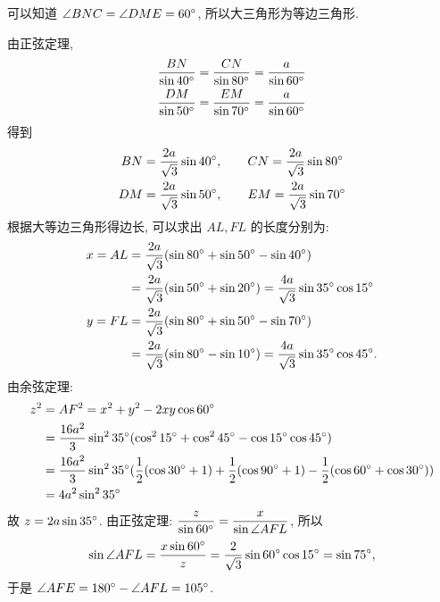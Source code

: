 可以知道 $\angle BNC = \angle DME = 60\degree$, 所以大三角形为等边三角形. 

由正弦定理, 
\begin{align*}
\frac{BN}{\sin 40\degree} &= \frac{CN}{\sin 80\degree} = \frac{a}{\sin 60\degree}\\
\frac{DM}{\sin 50\degree} &= \frac{EM}{\sin 70\degree} = \frac{a}{\sin 60\degree}
\end{align*}
得到
\begin{align*}
BN &= \frac{2a}{\sqrt{3}}\sin 40\degree, \qquad CN = \frac{2a}{\sqrt{3}}\sin 80\degree\\
DM &= \frac{2a}{\sqrt{3}}\sin 50\degree, \qquad EM = \frac{2a}{\sqrt{3}}\sin 70\degree
\end{align*}
根据大等边三角形得边长, 可以求出 $AL, FL$ 的长度分别为:
\begin{align*}
x = AL &= \frac{2a}{\sqrt{3}}(\sin 80\degree + \sin 50\degree - \sin 40\degree) \\
& = \frac{2a}{\sqrt{3}}(\sin 50\degree + \sin 20\degree) = \frac{4a}{\sqrt{3}}\sin 35\degree\cos 15\degree\\
y = FL &= \frac{2a}{\sqrt{3}}(\sin 80\degree + \sin 50\degree - \sin 70\degree) \\
& = \frac{2a}{\sqrt{3}}(\sin 80\degree - \sin10\degree) = \frac{4a}{\sqrt{3}}\sin 35\degree\cos 45\degree  .
\end{align*}
由余弦定理:
\begin{align*}
z^2 &= AF^2 = x^2+y^2-2xy\cos 60\degree\\
&= \frac{16a^2}{3}\sin^2 35\degree(\cos^2 15\degree+\cos^2 45\degree - \cos 15\degree\cos 45\degree) \\
&= \frac{16a^2}{3}\sin^2 35\degree(\frac{1}{2}(\cos 30\degree + 1) + \frac{1}{2}(\cos 90\degree + 1) - \frac{1}{2}(\cos 60\degree + \cos 30\degree)) \\
&= 4a^2\sin^2 35\degree
\end{align*}
故 $z = 2a\sin 35\degree$. 由正弦定理: $\dfrac{z}{\sin 60\degree} = \dfrac{x}{\sin\angle AFL}$, 所以 
\[
\sin \angle AFL = \frac{x\sin 60\degree}{z} = \frac{2}{\sqrt{3}}\sin 60\degree\cos 15\degree =  \sin 75\degree ,
\]
于是 $\angle AFE = 180\degree - \angle AFL = 105\degree$.

~

